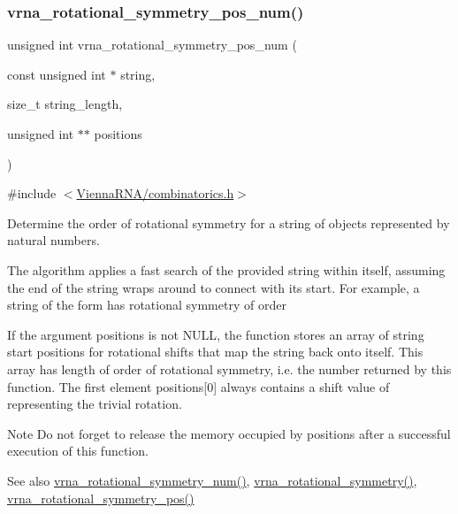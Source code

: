 \subsubsection{\texorpdfstring{vrna\_rotational\_symmetry\_pos\_num()}{vrna\_rotational\_symmetry\_pos\_num()}}
{\footnotesize\ttfamily unsigned int vrna\+\_\+rotational\+\_\+symmetry\+\_\+pos\+\_\+num (\begin{DoxyParamCaption}\item[{const unsigned int $\ast$}]{string,  }\item[{size\+\_\+t}]{string\+\_\+length,  }\item[{unsigned int $\ast$$\ast$}]{positions }\end{DoxyParamCaption})}



{\ttfamily \#include $<$\mbox{\hyperlink{combinatorics_8h}{Vienna\+R\+N\+A/combinatorics.\+h}}$>$}



Determine the order of rotational symmetry for a string of objects represented by natural numbers. 

The algorithm applies a fast search of the provided string within itself, assuming the end of the string wraps around to connect with it\textquotesingle{}s start. For example, a string of the form {} has rotational symmetry of order {} 

If the argument {\ttfamily positions} is not {\ttfamily N\+U\+LL}, the function stores an array of string start positions for rotational shifts that map the string back onto itself. This array has length of order of rotational symmetry, i.\+e. the number returned by this function. The first element {\ttfamily positions}\mbox{[}0\mbox{]} always contains a shift value of {} representing the trivial rotation.

\begin{DoxyNote}{Note}
Do not forget to release the memory occupied by {\ttfamily positions} after a successful execution of this function.
\end{DoxyNote}
\begin{DoxySeeAlso}{See also}
\mbox{\hyperlink{group__combinatorics__utils_gac51464b5281833a58c25f9447252c495}{vrna\+\_\+rotational\+\_\+symmetry\+\_\+num()}}, \mbox{\hyperlink{group__combinatorics__utils_gae1dec02c4b63f303ce06a9293d316762}{vrna\+\_\+rotational\+\_\+symmetry()}}, \mbox{\hyperlink{group__combinatorics__utils_ga294d48935fcac87ab335d771fe289ecb}{vrna\+\_\+rotational\+\_\+symmetry\+\_\+pos()}}
\end{DoxySeeAlso}

